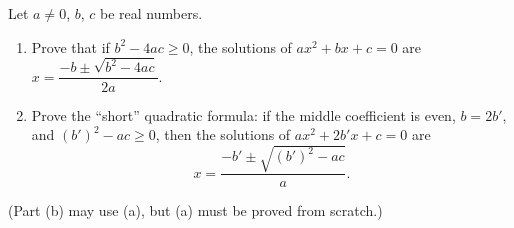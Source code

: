 Let $a\ne0$, $b$, $c$ be real numbers.
\begin{enumerate}
\item[(a)] Prove that if $b^2-4ac\ge0$, the solutions of $ax^2+bx+c=0$ are $x=\dfrac{-b\pm\sqrt{b^2-4ac}}{2a}$.
\item[(b)] Prove the ``short'' quadratic formula: if the middle coefficient is even, $b=2b'$, and $(b')^2-ac\ge0$, then the solutions of $ax^2+2b'x+c=0$ are
\[x=\dfrac{-b'\pm\sqrt{(b')^2-ac}}{a}.\]
\end{enumerate}
(Part (b) may use (a), but (a) must be proved from scratch.)
